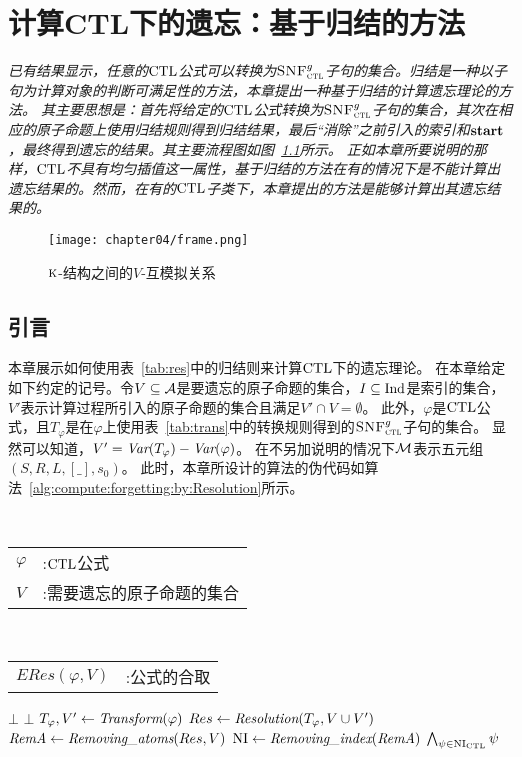 \chapter{计算CTL下的遗忘：基于归结的方法}\label{chapter04}
{\em 
已有结果显示，任意的$\textrm{CTL}$公式可以转换为${\textsc{SNF}_{\textsc{ctl}}^g}$子句的集合。归结是一种以子句为计算对象的判断可满足性的方法，本章提出一种基于归结的计算遗忘理论的方法。
其主要思想是：首先将给定的$\textrm{CTL}$公式转换为${\textsc{SNF}_{\textsc{ctl}}^g}$子句的集合，其次在相应的原子命题上使用归结规则得到归结结果，最后“消除”之前引入的索引和$\textbf{start}$，最终得到遗忘的结果。其主要流程图如图~\ref{Fig:chapter05:v1uv2}所示。
正如本章所要说明的那样，$\textrm{CTL}$不具有均匀插值这一属性，基于归结的方法在有的情况下是不能计算出遗忘结果的。然而，在有的$\textrm{CTL}$子类下，本章提出的方法是能够计算出其遗忘结果的。}
\begin{figure*}[!htb]
	\centering
	\texttt{[image: chapter04/frame.png]}\\
	\caption{$\textsc{k}$-结构之间的$V$-互模拟关系}
	\label{Fig:chapter05:v1uv2}
\end{figure*}

\section{引言}
本章展示如何使用表~\ref{tab:res}中的归结则来计算$\textrm{CTL}$下的遗忘理论。
在本章给定如下约定的记号。令$V\subseteq {\cal A}$是要遗忘的原子命题的集合，$I\subseteq \textrm{Ind}$是索引的集合，$V'$表示计算过程所引入的原子命题的集合且满足$V'\cap V=\emptyset$。
此外，$\varphi$是$\textrm{CTL}$公式，且$T_{\varphi}$是在$\varphi$上使用表~\ref{tab:trans}中的转换规则得到的${\textsc{SNF}_{\textsc{ctl}}^g}$子句的集合。
显然可以知道，$V'=\textit{Var}(T_{\varphi})-\textit{Var}(\varphi)$。
在不另加说明的情况下${\cal M}$表示五元组$(S,R,L,[\_],s_0)$。
此时，本章所设计的算法的伪代码如算法~\ref{alg:compute:forgetting:by:Resolution}所示。

\begin{algorithm}[htbp]
	\small
	\caption{\emph{ERes}$(\varphi, V)$}
	\label{alg:compute:forgetting:by:Resolution}
	\begin{algorithmic}[1]
		\REQUIRE ~~\\
		\begin{tabular}[t]{p{8mm}l}
			$\varphi$&:$\textrm{CTL}$公式\\
			$V$&:需要遗忘的原子命题的集合
		\end{tabular}
		\ENSURE ~~\\
		\begin{tabular}[t]{p{8mm}l}
			$ERes(\varphi, V)$&\qquad:公式的合取
		\end{tabular}
		\RETURN $\bot$
		\ENDIF
		\RETURN $\bot$
		\ENDIF
		\STATE $T_{\varphi}, V' \leftarrow \emph{Transform}(\varphi)$
		\STATE $Res \leftarrow \emph{Resolution}(T_{\varphi}, V\cup V')$
		\STATE $\emph{RemA} \leftarrow \emph{Removing\_atoms}(Res, V)$
		\STATE $\textrm{NI} \leftarrow \emph{Removing\_index}(\emph{RemA})$
		\RETURN $\bigwedge_{\psi \in \textrm{NI}_{\textrm{CTL}}} \psi$
	\end{algorithmic}
\end{algorithm}

